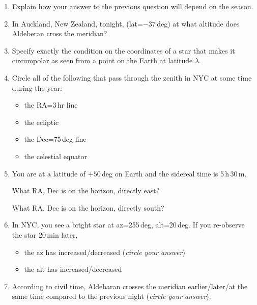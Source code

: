 \documentclass[12pt]{article}
\begin{document}
\begin{enumerate}
\vspace{0.5in}

\item
Explain how your answer to the previous question will depend on the
season.

\vspace{1in}

\item
In Auckland, New Zealand, tonight, (lat=$-37$\,deg) at what altitude
does Aldeberan cross the meridian?

\vspace{0.5in}

\item
Specify exactly the condition on the coordinates of a star that makes
it circumpolar as seen from a point on the Earth at latitude $\lambda$.

\vspace{1in}

\item
Circle all of the following that pass through the zenith in NYC at
some time during the year:
\begin{itemize}
\item the RA=3\,hr line
\item the ecliptic
\item the Dec=75\,deg line
\item the celestial equator
\end{itemize}

\item 
You are at a latitude of $+50$\,deg on Earth and the sidereal time is
5\,h\,30\,m.

What RA, Dec is on the horizon, directly east?

\vspace{0.5in}

What RA, Dec is on the horizon, directly south?

\vspace{0.5in}

\item
In NYC, you see a bright star at az=255\,deg, alt=20\,deg. If you
re-observe the star 20\,min later,
\begin{itemize}
\item the az has increased/decreased (\emph{circle your answer})
\item the alt has increased/decreased
\end{itemize}

\item 
According to civil time, Aldebaran crosses the meridian
earlier/later/at the same time compared to the previous night
(\emph{circle your answer}).


\end{enumerate}
\end{document}
